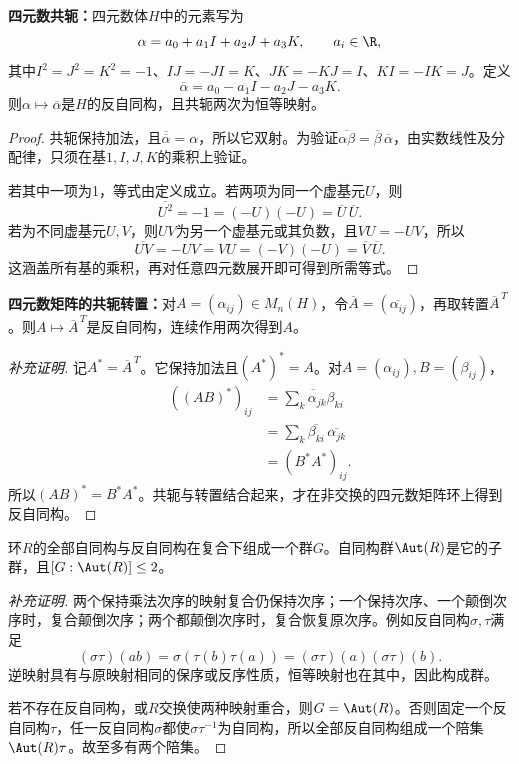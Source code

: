\begin{example}
\textbf{四元数共轭：}四元数体$H$中的元素写为
\[
\alpha=a_0+a_1I+a_2J+a_3K,\qquad a_i\in\R,
\]
其中$I^2=J^2=K^2=-1$、$IJ=-JI=K$、$JK=-KJ=I$、$KI=-IK=J$。定义
\[
\overline\alpha=a_0-a_1I-a_2J-a_3K.
\]
则$\alpha\mapsto\overline\alpha$是$H$的反自同构，且共轭两次为恒等映射。
\end{example}
\begin{proof}
共轭保持加法，且$\overline{\overline\alpha}=\alpha$，所以它双射。为验证$\overline{\alpha\beta}=\overline\beta\,\overline\alpha$，由实数线性及分配律，只须在基$1,I,J,K$的乘积上验证。

若其中一项为1，等式由定义成立。若两项为同一个虚基元$U$，则
\[
\overline{U^2}=-1=(-U)(-U)=\overline U\,\overline U.
\]
若为不同虚基元$U,V$，则$UV$为另一个虚基元或其负数，且$VU=-UV$，所以
\[
\overline{UV}=-UV=VU=(-V)(-U)=\overline V\,\overline U.
\]
这涵盖所有基的乘积，再对任意四元数展开即可得到所需等式。
\end{proof}

\begin{example}
\textbf{四元数矩阵的共轭转置：}对$A=(\alpha_{ij})\in M_n(H)$，令$\overline A=(\overline{\alpha_{ij}})$，再取转置$\overline A^{\,T}$。则$A\mapsto\overline A^{\,T}$是反自同构，连续作用两次得到$A$。
\end{example}
\begin{proof}[补充证明]
记$A^*=\overline A^{\,T}$。它保持加法且$(A^*)^*=A$。对$A=(\alpha_{ij}),B=(\beta_{ij})$，
\begin{align*}
((AB)^*)_{ij}
&=\overline{\sum_k\alpha_{jk}\beta_{ki}}\\
&=\sum_k\overline{\beta_{ki}}\,\overline{\alpha_{jk}}\\
&=(B^*A^*)_{ij}.
\end{align*}
所以$(AB)^*=B^*A^*$。共轭与转置结合起来，才在非交换的四元数矩阵环上得到反自同构。
\end{proof}

\begin{proposition}
环$R$的全部自同构与反自同构在复合下组成一个群$G$。自同构群$\Aut(R)$是它的子群，且$[G:\Aut(R)]\leq2$。
\end{proposition}
\begin{proof}[补充证明]
两个保持乘法次序的映射复合仍保持次序；一个保持次序、一个颠倒次序时，复合颠倒次序；两个都颠倒次序时，复合恢复原次序。例如反自同构$\sigma,\tau$满足
\[
(\sigma\tau)(ab)=\sigma(\tau(b)\tau(a))
=(\sigma\tau)(a)(\sigma\tau)(b).
\]
逆映射具有与原映射相同的保序或反序性质，恒等映射也在其中，因此构成群。

若不存在反自同构，或$R$交换使两种映射重合，则$G=\Aut(R)$。否则固定一个反自同构$\tau$，任一反自同构$\sigma$都使$\sigma\tau^{-1}$为自同构，所以全部反自同构组成一个陪集$\Aut(R)\tau$。故至多有两个陪集。
\end{proof}

